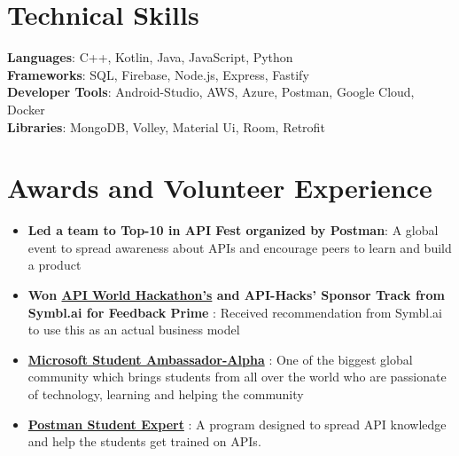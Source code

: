 \documentclass[letterpaper,11pt]{article}
\newcommand{\resumeItem}[1]{
  \item\small{
    {#1 \vspace{-2pt}}
  }
}
\newcommand{\resumeItemListStart}{\begin{itemize}}
\newcommand{\resumeItemListEnd}{\end{itemize}\vspace{-5pt}}
\begin{document}
\section{Technical Skills}
 \begin{itemize}[leftmargin=0.15in, label={}]
    \small{\item{
     \textbf{Languages}{: C++, Kotlin, Java, JavaScript, Python} \\
     \textbf{Frameworks}{: SQL, Firebase, Node.js, Express, Fastify  } \\
     \textbf{Developer Tools}{: Android-Studio, AWS, Azure, Postman, Google Cloud, Docker } \\
     \textbf{Libraries}{: MongoDB, Volley, Material Ui, Room, Retrofit  }
    }}
 \end{itemize}

\section{Awards and Volunteer Experience }
 \begin{itemize}[leftmargin=0.15in, label={}]
    \small{\item{
        \resumeItemListStart
                \resumeItem{\textbf{Led a team to {Top-10 in API Fest} organized by Postman}: A global event to spread awareness about APIs and encourage peers to learn and build a product}
                \resumeItem{\textbf{{Won \href{https://devpost.com/software/feedback-prime-kbg8um}{API World Hackathon's} and {API-Hacks'} Sponsor Track from Symbl.ai for Feedback Prime} }: Received recommendation from Symbl.ai to use this as an actual business model}
                \resumeItem{\textbf{\href{https://studentambassadors.microsoft.com/en-US/profile/124303}{Microsoft Student Ambassador-Alpha}} : One of the biggest global community which brings students from all over the world who are passionate of technology, learning and helping the community }
                \resumeItem{\textbf{\href{https://api.badgr.io/public/assertions/smxpDApNQkawRdyLq88rTA}{ Postman Student Expert}} : A program designed to spread API knowledge and help the students get trained on APIs.}
      \resumeItemListEnd
    }}
 \end{itemize}
 
 
\end{document}
